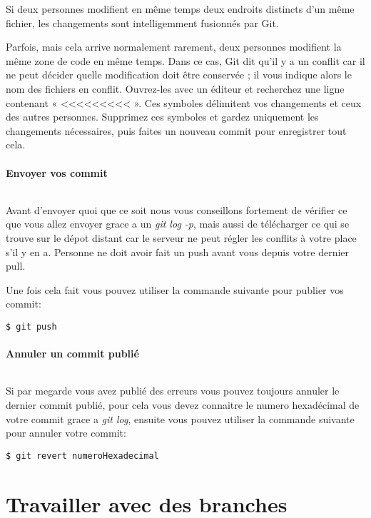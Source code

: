 \documentclass[french, a4paper, 12pt, titlepage]{article}
\begin{document}
Si deux personnes modifient en même temps deux endroits distincts d’un même fichier, les changements sont intelligemment fusionnés par Git.

Parfois, mais cela arrive normalement rarement, deux personnes modifient la même zone de code en même temps. Dans ce cas, Git dit qu’il y a un conflit car il ne peut décider quelle modification doit être conservée ; il vous indique alors le nom des fichiers en conflit. Ouvrez-les avec un éditeur et recherchez une ligne contenant « <<<<<<<<< ». Ces symboles délimitent vos changements et ceux des autres personnes. Supprimez ces symboles et gardez uniquement les changements nécessaires, puis faites un nouveau commit pour enregistrer tout cela.

\subsection{Envoyer vos commit}
\paragraph{}Avant d'envoyer quoi que ce soit nous vous conseillons fortement de vérifier ce que vous allez envoyer grace a un \emph{git log -p}, mais aussi de télécharger ce qui se trouve sur le dépot distant car le serveur ne peut régler les conflits à votre place s’il y en a. Personne ne doit avoir fait un push avant vous depuis votre dernier pull.

Une fois cela fait vous pouvez utiliser la commande suivante pour publier vos commit:
\begin{lstlisting}
$ git push
\end{lstlisting}

\subsection{Annuler un commit publié}
\paragraph{}Si par megarde vous avez publié des erreurs vous pouvez toujours annuler le dernier commit publié, pour cela vous devez connaitre le numero hexadécimal de votre commit grace a \emph{git log}, ensuite vous pouvez utiliser la commande suivante pour annuler votre commit:
\begin{lstlisting}
$ git revert numeroHexadecimal
\end{lstlisting}

\part{Travailler avec des branches}
\end{document}
